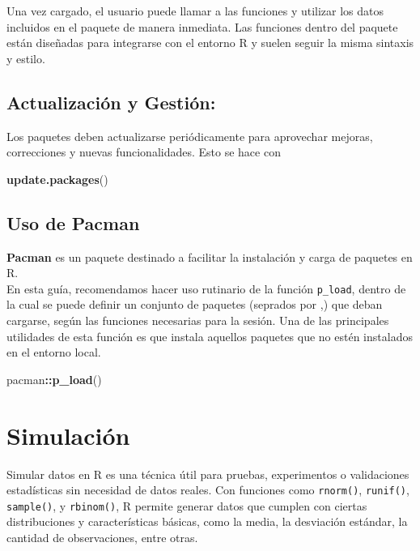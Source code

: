 \documentclass[
]{book}
\newenvironment{Shaded}{\begin{snugshade}}{\end{snugshade}}
\newcommand{\FunctionTok}[1]{\textcolor[rgb]{0.13,0.29,0.53}{\textbf{#1}}}
\newcommand{\NormalTok}[1]{#1}
\newcommand{\SpecialCharTok}[1]{\textcolor[rgb]{0.81,0.36,0.00}{\textbf{#1}}}
\begin{document}
Una vez cargado, el usuario puede llamar a las funciones y utilizar los datos incluidos en el paquete de manera inmediata. Las funciones dentro del paquete están diseñadas para integrarse con el entorno R y suelen seguir la misma sintaxis y estilo.

\hypertarget{actualizaciuxf3n-y-gestiuxf3n}{%
\section{Actualización y Gestión:}\label{actualizaciuxf3n-y-gestiuxf3n}}

Los paquetes deben actualizarse periódicamente para aprovechar mejoras, correcciones y nuevas funcionalidades. Esto se hace con

\begin{Shaded}
\begin{Highlighting}[]
\FunctionTok{update.packages}\NormalTok{()}
\end{Highlighting}
\end{Shaded}

\hypertarget{uso-de-pacman}{%
\section{Uso de Pacman}\label{uso-de-pacman}}

\textbf{Pacman} es un paquete destinado a facilitar la instalación y carga de paquetes en R.\\
En esta guía, recomendamos hacer uso rutinario de la función \texttt{p\_load}, dentro de la cual se puede definir un conjunto de paquetes (seprados por ,) que deban cargarse, según las funciones necesarias para la sesión. Una de las principales utilidades de esta función es que instala aquellos paquetes que no estén instalados en el entorno local.

\begin{Shaded}
\begin{Highlighting}[]
\NormalTok{pacman}\SpecialCharTok{::}\FunctionTok{p\_load}\NormalTok{()}
\end{Highlighting}
\end{Shaded}

\hypertarget{simulaciuxf3n}{%
\chapter{Simulación}\label{simulaciuxf3n}}

Simular datos en R es una técnica útil para pruebas, experimentos o validaciones estadísticas sin necesidad de datos reales. Con funciones como \texttt{rnorm()}, \texttt{runif()}, \texttt{sample()}, y \texttt{rbinom()}, R permite generar datos que cumplen con ciertas distribuciones y características básicas, como la media, la desviación estándar, la cantidad de observaciones, entre otras.
\end{document}
